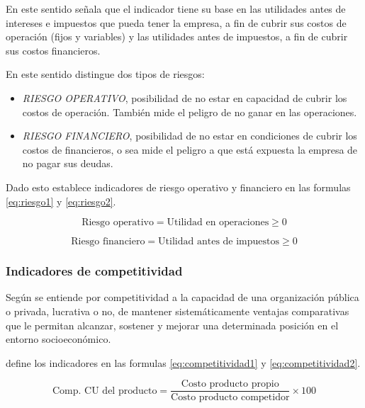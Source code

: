 En este sentido \cite{cruz} se\~nala que el indicador tiene su base en las
utilidades antes de intereses e impuestos que pueda tener la empresa, a fin de
cubrir sus costos de operaci\'on (fijos y variables) y las utilidades antes de
impuestos, a fin de cubrir sus costos financieros.

En este sentido \cite{cruz} distingue dos tipos de riesgos:
\begin{itemize}
    \item \emph{RIESGO OPERATIVO}, posibilidad de no estar en capacidad de cubrir
          los costos de operaci\'on. Tambi\'en mide el peligro de no ganar en las
          operaciones.
    \item \emph{RIESGO FINANCIERO}, posibilidad de no estar en condiciones de
          cubrir los costos de financieros, o sea mide el peligro a que est\'a
          expuesta la empresa de no pagar sus deudas.
\end{itemize}

Dado esto \cite{cruz} establece indicadores de riesgo operativo y financiero en las
formulas \ref{eq:riesgo1} y \ref{eq:riesgo2}.

\begin{equation}\label{eq:riesgo1}
    \text{Riesgo operativo} = \text{Utilidad en operaciones} \geq 0
\end{equation}

\begin{equation}\label{eq:riesgo2}
    \text{Riesgo financiero} = \text{Utilidad antes de impuestos} \geq 0
\end{equation}

\subsubsection{Indicadores de competitividad}
Seg\'un \cite{cruz} se entiende por competitividad a la capacidad de una organizaci\'on
p\'ublica o privada, lucrativa o no, de mantener sistem\'aticamente ventajas comparativas
que le permitan alcanzar, sostener y mejorar una determinada posici\'on en el entorno
socioecon\'omico.

\cite{cruz} define los indicadores en las formulas \ref{eq:competitividad1} y
\ref{eq:competitividad2}.

\begin{equation}\label{eq:competitividad1}
    \text{Comp. CU del producto} = \frac{\text{Costo producto propio}}{\text{Costo producto competidor}} \times{100}
\end{equation}

